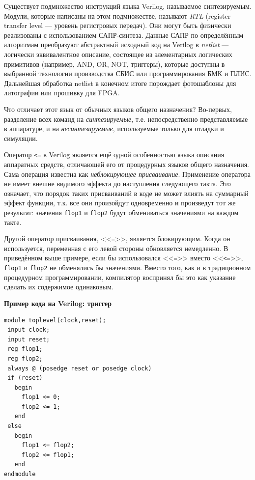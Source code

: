 Существует подмножество инструкций языка Verilog, называемое синтезируемым. Модули, которые написаны на этом подмножестве, называют \textit{RTL} (\abbr register transfer level --- уровень регистровых передач). Они могут быть физически реализованы с использованием САПР-синтеза. Данные САПР по определённым алгоритмам преобразуют абстрактный исходный код на Verilog в \emph{netlist} --- логически эквивалентное описание, состоящее из элементарных логических примитивов (например, AND, OR, NOT, триггеры), которые доступны в выбранной технологии производства СБИС или программирования БМК и ПЛИС. Дальнейшая обработка netlist в конечном итоге порождает фотошаблоны для литографии или прошивку для FPGA.

Что отличает этот язык от обычных языков общего назначения? Во-первых, разделение всех команд на \textit{синтезируемые}, т.е. непосредственно представляемые в аппаратуре, и на \textit{несинтезируемые}, используемые только для отладки и симуляции.

Оператор \texttt{<=} в Verilog является ещё одной особенностью языка описания аппаратных средств, отличающей его от процедурных языков общего назначения. Сама операция известна как \textit{неблокирующее присваивание}. Применение оператора не имеет внешне видимого эффекта до наступления следующего такта. Это означает, что порядок таких присваиваний в коде не может влиять на суммарный эффект функции, т.к. все они произойдут одновременно и произведут тот же результат: значения \texttt{flop1} и \texttt{flop2} будут обмениваться значениями на каждом такте.

Другой оператор присваивания, <<\texttt{=}>>, является блокирующим. Когда он используется, переменная с его левой стороны обновляется немедленно. В приведённом выше примере, если бы использовался <<\texttt{=}>> вместо <<\texttt{<=}>>, \texttt{flop1} и \texttt{flop2} не обменялись бы значениями. Вместо того, как и в традиционном процедурном программировании, компилятор воспринял бы это как указание сделать их содержимое одинаковым.

\textbf{Пример кода на Verilog: триггер} %

\begin{lstlisting}
module toplevel(clock,reset);
 input clock;
 input reset;
 reg flop1;
 reg flop2;
 always @ (posedge reset or posedge clock)
 if (reset)
   begin
     flop1 <= 0;
     flop2 <= 1;
   end
 else
   begin
     flop1 <= flop2;
     flop2 <= flop1;
   end
endmodule         
\end{lstlisting}

